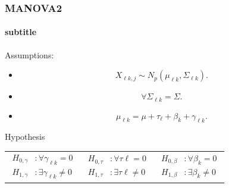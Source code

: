 \documentclass[aspectratio=169,10pt,t]{beamer}
\begin{document}
\begin{frame}[t]
	\frametitle{MANOVA2}
	\framesubtitle{subtitle}

	Assumptions:
	\begin{itemize}
		\item 
			\[
				X_{\ell k,j} \sim N_{p}  \left( \mu_{\ell k}, \Sigma_{\ell k}  \right) 
			.\] 
		\item 
			\[
				\forall \Sigma_{\ell k} = \Sigma
			.\] 
		\item 
			\[
			\mu_{\ell k} = \mu + \tau_{\ell} + \beta_{k} + \gamma_{\ell k}
			.\] 
	\end{itemize}

	Hypothesis\\
	\begin{centering}
		
	\begin{tabular}{ccc}
		$
		\begin{aligned}
			H_{0,\gamma} &: \forall \gamma_{\ell k} = 0\\
			H_{1,\gamma} &: \exists \gamma_{\ell k} \neq 0
		\end{aligned}
		$ & $
		\begin{aligned}
			H_{0,\tau} &: \forall \tau{\ell} = 0\\
			H_{1,\tau} &: \exists \tau{\ell} \neq 0
		\end{aligned}
			$	& $
		\begin{aligned}
			H_{0,\beta} &: \forall \beta_{k} = 0\\
			H_{1,\beta} &: \exists \beta_{k} \neq 0
		\end{aligned}
				$
	\end{tabular}
	\end{centering}
\end{frame}
\end{document}
